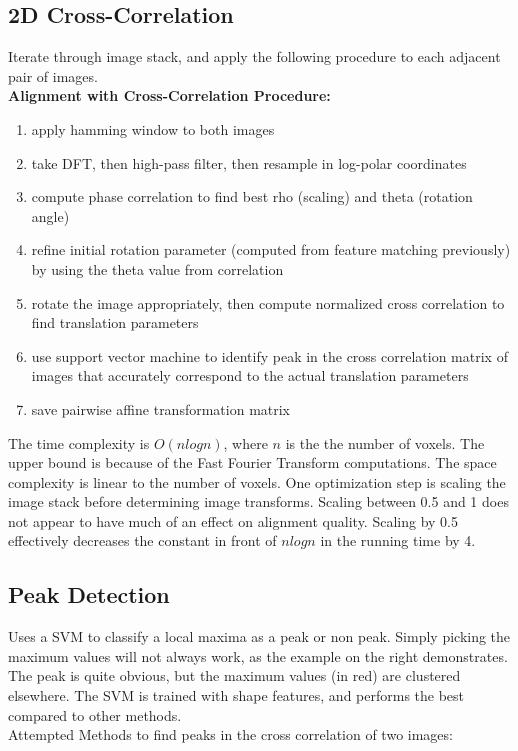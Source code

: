 \documentclass{article}
\begin{document}
\subsection{2D Cross-Correlation}
Iterate through image stack, and apply the following procedure to each adjacent pair of images. \\
\textbf{Alignment with Cross-Correlation Procedure:}
\begin{enumerate}
\item apply hamming window to both images
\item take DFT, then high-pass filter, then resample in log-polar coordinates
\item compute phase correlation to find best rho (scaling) and theta (rotation angle)
\item refine initial rotation parameter (computed from feature matching previously) by using the theta value from correlation
\item rotate the image appropriately, then compute normalized cross correlation to find translation parameters
\item use support vector machine to identify peak in the cross correlation matrix of images that accurately correspond to the actual translation parameters
\item save pairwise affine transformation matrix
\end{enumerate}

The time complexity is $O(nlogn)$, where $n$ is the the number of voxels. The upper bound is because of the Fast Fourier Transform computations. The space complexity is linear to the number of voxels. One optimization step is scaling the image stack before determining image transforms. Scaling between 0.5 and 1 does not appear to have much of an effect on alignment quality. Scaling by 0.5 effectively decreases the constant in front of $nlogn$ in the running time by 4. \\

\subsection{Peak Detection}

Uses a SVM to classify a local maxima as a peak or non peak. 
Simply picking the maximum values will not always work, as the example on the right demonstrates. The peak is quite obvious, but the maximum values (in red) are clustered elsewhere. The SVM is trained with shape features, and performs the best compared to other methods.\\
Attempted Methods to find peaks in the cross correlation of two images:
\end{document}
